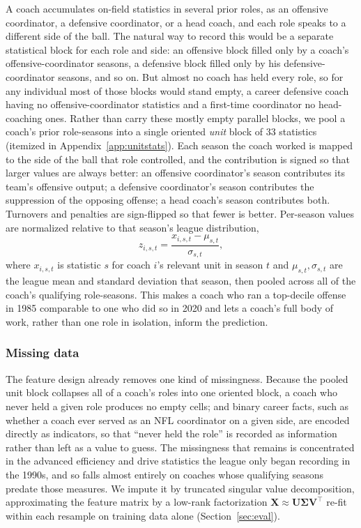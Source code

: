 \documentclass[USenglish]{article}
\theoremstyle{dgthm}
\theoremstyle{dgdef}
\begin{document}
A coach accumulates on-field statistics in several prior roles, as an offensive coordinator, a defensive coordinator, or a head coach, and each role speaks to a different side of the ball. The natural way to record this would be a separate statistical block for each role and side: an offensive block filled only by a coach's offensive-coordinator seasons, a defensive block filled only by his defensive-coordinator seasons, and so on. But almost no coach has held every role, so for any individual most of those blocks would stand empty, a career defensive coach having no offensive-coordinator statistics and a first-time coordinator no head-coaching ones. Rather than carry these mostly empty parallel blocks, we pool a coach's prior role-seasons into a single oriented \emph{unit} block of 33 statistics (itemized in Appendix~\ref{app:unitstats}). Each season the coach worked is mapped to the side of the ball that role controlled, and the contribution is signed so that larger values are always better: an offensive coordinator's season contributes its team's offensive output; a defensive coordinator's season contributes the suppression of the opposing offense; a head coach's season contributes both. Turnovers and penalties are sign-flipped so that fewer is better. Per-season values are normalized relative to that season's league distribution,
\begin{equation}
z_{i,s,t} = \frac{x_{i,s,t} - \mu_{s,t}}{\sigma_{s,t}},
\label{eq:zscore}
\end{equation}
where $x_{i,s,t}$ is statistic $s$ for coach $i$'s relevant unit in season $t$ and $\mu_{s,t}, \sigma_{s,t}$ are the league mean and standard deviation that season, then pooled across all of the coach's qualifying role-seasons. This makes a coach who ran a top-decile offense in 1985 comparable to one who did so in 2020 and lets a coach's full body of work, rather than one role in isolation, inform the prediction.

\subsubsection{Missing data}

The feature design already removes one kind of missingness. Because the pooled unit block collapses all of a coach's roles into one oriented block, a coach who never held a given role produces no empty cells; and binary career facts, such as whether a coach ever served as an NFL coordinator on a given side, are encoded directly as indicators, so that ``never held the role'' is recorded as information rather than left as a value to guess. The missingness that remains is concentrated in the advanced efficiency and drive statistics the league only began recording in the 1990s, and so falls almost entirely on coaches whose qualifying seasons predate those measures. We impute it by truncated singular value decomposition, approximating the feature matrix by a low-rank factorization $\mathbf{X} \approx \mathbf{U}\boldsymbol{\Sigma}\mathbf{V}^\top$ re-fit within each resample on training data alone (Section~\ref{sec:eval}).
\end{document}
